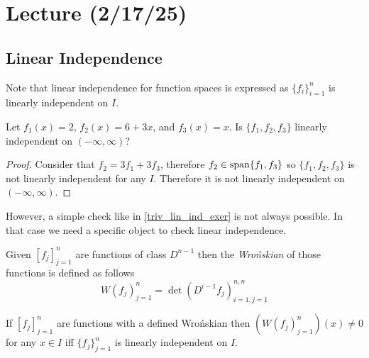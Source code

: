 \documentclass[notes]{subfiles}
\begin{document}
\setcounter{section}{8}
\section{Lecture (2/17/25)}
\subsection{Linear Independence}
Note that linear independence for function spaces is expressed as $\{ f_i \}_{i = 1}^n$ is linearly independent on $I$.

\begin{exercise} \label{triv_lin_ind_exer}
    Let $f_1(x) = 2$, $f_2(x) = 6 + 3x$, and $f_3(x) = x$. Is $\{ f_1, f_2, f_3 \}$ linearly independent on $(-\infty, \infty)$?
\end{exercise}
\begin{proof}
    Consider that $f_2 = 3f_1 + 3f_3$, therefore $f_2 \in \operatorname{span}\{ f_1, f_3 \}$ so $\{ f_1, f_2, f_3 \}$ is not linearly independent for any $I$. Therefore it is not linearly independent on $(-\infty, \infty)$.
\end{proof}

However, a simple check like in \cref{triv_lin_ind_exer} is not always possible. In that case we need a specific object to check linear independence.

\begin{definition}
    Given $[f_j]_{j = 1}^n$ are functions of class $D^{n - 1}$ then the \textsl{Wro\'nskian} of those functions is defined as follows
    \[
        W(f_j)_{j = 1}^n = \det(D^{i - 1}f_j)_{i = 1, j = 1}^{n, n}
    \]
\end{definition}

\begin{theorem} \label{wronskian_theorem}
    If $[f_j]_{j = 1}^n$ are functions with a defined Wro\'nskian then $(W(f_j)_{j = 1}^n)(x) \neq 0$ for any $x \in I$ iff $\{ f_j \}_{j = 1}^n$ is linearly independent on $I$.
\end{theorem}
\end{document}
